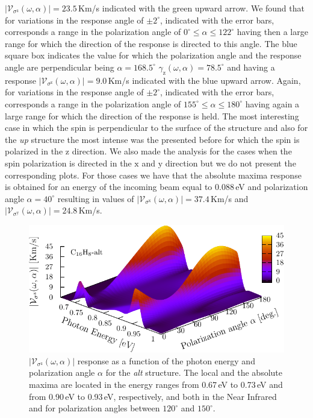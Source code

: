 \documentclass[prb,11pt,tightenlines,twocolumn,aps]{revtex4-1}
\begin{document}
$|\mathcal{V}_{\sigma^{\mathrm{z}}}(\omega,\alpha)|=23.5$\,Km/s indicated with
the green upward arrow. We found that for variations in the response angle of
$\pm 2^{\circ}$, indicated with the error bars, corresponds a range in the
polarization angle of $0^{\circ} \leq \alpha \leq 122^{\circ}$ having then a
large range for which the direction of the response is directed to this angle.
% 
The blue square box indicates the value for which the polarization angle and the
response angle are perpendicular being $\alpha=168.5^{\circ}$
$\gamma_{\mathrm{z}}(\omega,\alpha)=78.5^{\circ}$ and having a response
$|\mathcal{V}_{\sigma^{\mathrm{z}}}(\omega,\alpha)|=9.0$\,Km/s indicated with
the blue upward arrow. Again, for variations in the response angle of
$\pm2^{\circ}$, indicated with the error bars, corresponds a range in the
polarization angle of $155^{\circ} \leq \alpha \leq 180^{\circ}$ having again a
large range for which the direction of the response is held.
% 
The most interesting case in which the spin is perpendicular to the surface of
the structure and also for the \emph{up} structure the most intense was the
presented before for which the spin is polarized in the $\mathrm{z}$ direction.
We also made the analysis for the cases when the spin polarization is directed
in the $\mathrm{x}$ and $\mathrm{y}$ direction but we do not present the
corresponding plots. For those cases we have that the absolute maxima response
is obtained for an energy of the incoming beam equal to 0.088\,eV and
polarization angle $\alpha=40^{\circ}$ resulting in values of
$|\mathcal{V}_{\sigma^{\mathrm{x}}}(\omega,\alpha)|=37.4$\,Km/s and
$|\mathcal{V}_{\sigma^{\mathrm{y}}}(\omega,\alpha)|=24.8$\,Km/s.


\begin{figure}[tb]
    \centering
    \includegraphics[width=\linewidth]{altplots/alt-3d-svaz}
    \caption{$|\mathcal{V}_{\sigma^{\mathrm{z}}}(\omega,\alpha)|$ response
    as a function of the photon energy and polarization angle $\alpha$  for the
    \emph{alt} structure. The local and the absolute maxima are located in the
    energy ranges from 0.67\,eV to 0.73\,eV and from 0.90\,eV to 0.93\,eV,
    respectively, and both in the Near Infrared and for polarization angles
    between $120^{\circ}$ and $150^{\circ}$.}
    \label{fig:alt-3d-vsb}
\end{figure}
\end{document}
